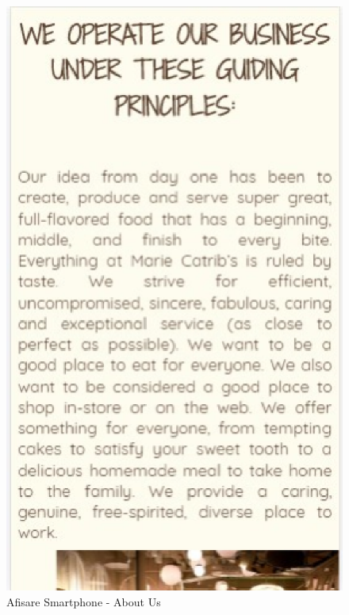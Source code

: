 \documentclass[11pt]{article}
\begin{document}
\begin{figure}[h]
\includegraphics{images/81.eps}
\caption{Afisare Smartphone - About Us}
\end{figure}
\end{document}
